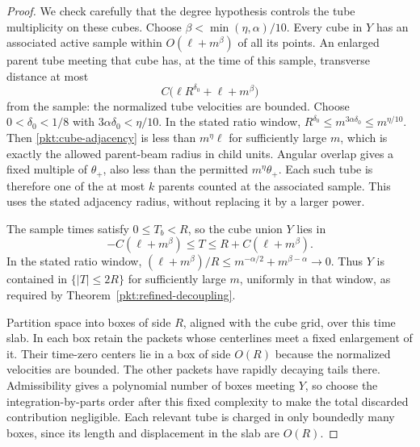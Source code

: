 \begin{proof}
We check carefully that the degree hypothesis controls the tube
multiplicity on these cubes.  Choose
$\beta<\min(\eta,\alpha)/10$.  Every cube in $Y$ has an associated active
sample within $O(\ell+m^\beta)$ of all its points.  An enlarged parent
tube meeting that cube has, at the time of this sample, transverse
distance at most
\begin{equation}\label{pkt:cube-adjacency}
 C\bigl(\ell R^{\delta_0}+\ell+m^\beta\bigr)
\end{equation}
from the sample: the normalized tube velocities are bounded.
Choose $0<\delta_0<1/8$ with $3\alpha\delta_0<\eta/10$.
In the stated ratio window, $R^{\delta_0}\le m^{3\alpha\delta_0}
\le m^{\eta/10}$.  Then
\eqref{pkt:cube-adjacency} is less than $m^\eta\ell$ for sufficiently
large $m$, which is exactly the allowed parent-beam radius in child
units.  Angular overlap gives a fixed multiple of $\theta_+$, also
less than the permitted $m^\eta\theta_+$.  Each such tube is therefore
one of the at most $k$ parents counted at the associated sample.
This uses the stated adjacency radius, without replacing it by a
larger power.

The sample times satisfy $0\le T_b<R$, so the cube union $Y$ lies in
\[
 -C(\ell+m^\beta)\le T\le R+C(\ell+m^\beta).
\]
In the stated ratio window,
$(\ell+m^\beta)/R\le m^{-\alpha/2}+m^{\beta-\alpha}\to0$.
Thus $Y$ is contained in $\{|T|\le2R\}$ for sufficiently large $m$,
uniformly in that window, as required by
Theorem~\ref{pkt:refined-decoupling}.

Partition space into boxes of side $R$, aligned with the cube grid,
over this time slab.  In each box retain the packets whose centerlines
meet a fixed enlargement of
it.  Their time-zero centers lie in a box of side $O(R)$ because the
normalized velocities are bounded.  The other packets have rapidly
decaying tails there.  Admissibility gives a polynomial number of
boxes meeting $Y$, so choose the integration-by-parts order after this
fixed complexity to make the total discarded contribution negligible.
Each relevant tube is charged in only boundedly many boxes, since its
length and displacement in the slab are $O(R)$.


\end{proof}
